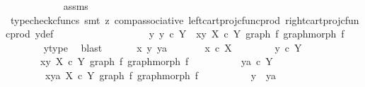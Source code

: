 \begin{isabellebody}
\ \ \ \ \ \ \ \ \ \ \isamarkupfalse%
\ assms\ \ \isanewline
\ \ \ \ \ \ \ \ \ \ \isamarkupfalse%
\ {\isacharparenleft}{\kern0pt}typecheck{\isacharunderscore}{\kern0pt}cfuncs{\isacharcomma}{\kern0pt}\ smt\ {\isacharparenleft}{\kern0pt}z{}{\isacharparenright}{\kern0pt}\ comp{\isacharunderscore}{\kern0pt}associative{}\ left{\isacharunderscore}{\kern0pt}cart{\isacharunderscore}{\kern0pt}proj{\isacharunderscore}{\kern0pt}cfunc{\isacharunderscore}{\kern0pt}prod\ right{\isacharunderscore}{\kern0pt}cart{\isacharunderscore}{\kern0pt}proj{\isacharunderscore}{\kern0pt}cfunc{\isacharunderscore}{\kern0pt}prod\ y{\isacharunderscore}{\kern0pt}def{\isacharparenright}{\kern0pt}\isanewline
\ \ \ \ \ \ \isamarkupfalse%
\isanewline
\ \ \ \ \isamarkupfalse%
\isanewline
\ \ \ \ \isamarkupfalse%
\ \isamarkupfalse%
\ {\isachardoublequoteopen}{\isasymexists}y{\isachardot}{\kern0pt}\ y\ {\isasymin}\isactrlsub c\ Y\ {\isasymand}\ {\isasymlangle}x{\isacharcomma}{\kern0pt}y{\isasymrangle}\ {\isasymin}\isactrlbsub X\ {\isasymtimes}\isactrlsub c\ Y\isactrlesub \ {\isacharparenleft}{\kern0pt}graph\ f{\isacharcomma}{\kern0pt}\ graph{\isacharunderscore}{\kern0pt}morph\ f{\isacharparenright}{\kern0pt}{\isachardoublequoteclose}\isanewline
\ \ \ \ \ \ \isamarkupfalse%
\ y{\isacharunderscore}{\kern0pt}type\ \isamarkupfalse%
\ blast\isanewline
\ \ \isamarkupfalse%
\isanewline
\ \ \isamarkupfalse%
\ {\isachardoublequoteopen}{\isasymAnd}x\ y\ ya{\isachardot}{\kern0pt}\isanewline
\ \ \ \ \ \ \ x\ {\isasymin}\isactrlsub c\ X\ {\isasymLongrightarrow}\isanewline
\ \ \ \ \ \ \ y\ {\isasymin}\isactrlsub c\ Y\ {\isasymLongrightarrow}\isanewline
\ \ \ \ \ \ \ {\isasymlangle}x{\isacharcomma}{\kern0pt}y{\isasymrangle}\ {\isasymin}\isactrlbsub X\ {\isasymtimes}\isactrlsub c\ Y\isactrlesub \ {\isacharparenleft}{\kern0pt}graph\ f{\isacharcomma}{\kern0pt}\ graph{\isacharunderscore}{\kern0pt}morph\ f{\isacharparenright}{\kern0pt}\ {\isasymLongrightarrow}\ \isanewline
\ \ \ \ \ \ \ \ ya\ {\isasymin}\isactrlsub c\ Y\ {\isasymLongrightarrow}\ \isanewline
\ \ \ \ \ \ \ \ {\isasymlangle}x{\isacharcomma}{\kern0pt}ya{\isasymrangle}\ {\isasymin}\isactrlbsub X\ {\isasymtimes}\isactrlsub c\ Y\isactrlesub \ {\isacharparenleft}{\kern0pt}graph\ f{\isacharcomma}{\kern0pt}\ graph{\isacharunderscore}{\kern0pt}morph\ f{\isacharparenright}{\kern0pt}\isanewline
\ \ \ \ \ \ \ \ \ {\isasymLongrightarrow}\ y\ {\isacharequal}{\kern0pt}\ ya{\isachardoublequoteclose}\isanewline

\end{isabellebody}
